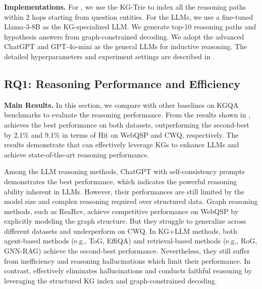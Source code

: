 \noindent\textbf{Implementations.} For \ourmethod, we use the KG-Trie to index all the reasoning paths within 2 hops starting from question entities. For the LLMs, we use a fine-tuned Llama-3-8B \citep{llama3} as the KG-specialized LLM. We generate top-10 reasoning paths and hypothesis answers from graph-constrained decoding. We adopt the advanced ChatGPT \citep{chatgpt} and GPT-4o-mini \citep{gpt4o} as the general LLMs for inductive reasoning. The detailed hyperparameters and experiment settings are described in .



\subsection{RQ1: Reasoning Performance and Efficiency}\label{sec:kgqa}
\noindent\textbf{Main Results.}
In this section, we compare \ourmethod with other baselines on KGQA benchmarks to evaluate the reasoning performance. 
%
From the results shown in , \ourmethod achieves the best performance on both datasets, outperforming the second-best by 2.1\% and 9.1\%
in terms of Hit on WebQSP and CWQ, respectively. The results demonstrate that \ourmethod can effectively leverage KGs to enhance LLMs and achieve state-of-the-art reasoning performance.

Among the LLM reasoning methods, ChatGPT with self-consistency prompts demonstrates the best performance, which indicates the powerful reasoning ability inherent in LLMs. However, their performances are still limited by the model size and complex reasoning required over structured data. Graph reasoning methods, such as ReaRev, achieve competitive performance on WebQSP by explicitly modeling the graph structure. But they struggle to generalize across different datasets and underperform on CWQ. In KG+LLM methods, both agent-based methods (e.g., ToG, EffiQA) and retrieval-based methods (e.g., RoG, GNN-RAG) achieve the second-best performance. 
%
Nevertheless, they still suffer from inefficiency and reasoning hallucinations which limit their performance. In contrast, \ourmethod effectively eliminates hallucinations and conducts faithful reasoning by leveraging the structured KG index and graph-constrained decoding.

